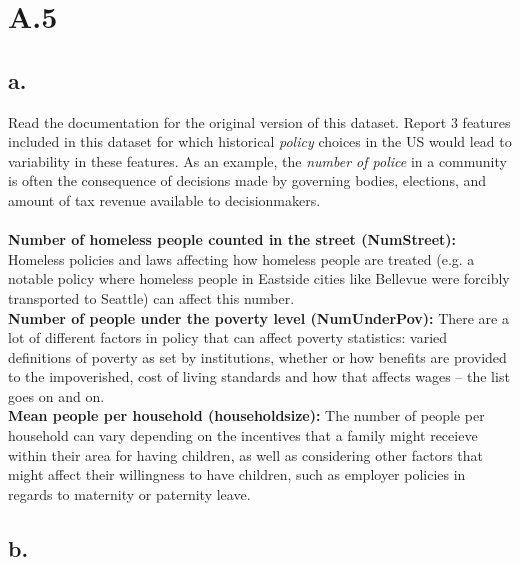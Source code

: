 \documentclass{article}
\newcommand{\1}{\mathbf{1}}
\begin{document}
\section*{A.5}
{\Large 

\subsection*{a.}

Read the documentation for the original
  version of this dataset. Report 3 features included in this dataset for which historical \emph{policy} choices in the US would lead to variability in these features. As an example, the \emph{number of police} in a community
  is often the consequence of decisions made by governing bodies, elections, and amount of tax revenue available to decisionmakers. \\ \\
\textbf{Number of homeless people counted in the street (NumStreet):} Homeless policies and laws affecting how homeless people are treated (e.g. a notable policy where homeless people in Eastside cities like Bellevue were forcibly transported to Seattle) can affect this number. \\
\textbf{Number of people under the poverty level (NumUnderPov):} There are a lot of different factors in policy that can affect poverty statistics: varied definitions of poverty as set by institutions, whether or how benefits are provided to the impoverished, cost of living standards and how that affects wages -- the list goes on and on. \\
\textbf{Mean people per household (householdsize):} The number of people per household can vary depending on the incentives that a family might receieve within their area for having children, as well as considering other factors that might affect their willingness to have children, such as employer policies in regards to maternity or paternity leave. \\

\subsection*{b.}

}
\end{document}

